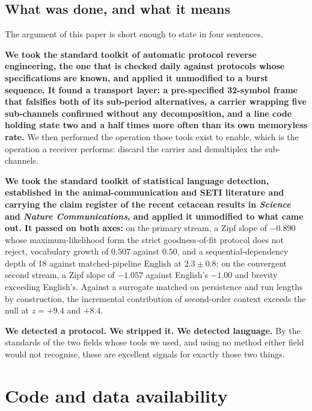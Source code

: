 \documentclass[11pt,a4paper]{article}
\begin{document}
\subsection{What was done, and what it means}

The argument of this paper is short enough to state in four sentences.

\textbf{We took the standard toolkit of automatic protocol reverse engineering, the one
that is checked daily against protocols whose specifications are known, and applied it
unmodified to a burst sequence. It found a transport layer: a pre-specified 32-symbol
frame that falsifies both of its sub-period alternatives, a carrier wrapping five
sub-channels confirmed without any decomposition, and a line code holding state two
and a half times more often than its own memoryless rate.} We then performed the
operation those tools exist to enable, which is the operation a receiver performs:
discard the carrier and demultiplex the sub-channels.

\textbf{We took the standard toolkit of statistical language detection, established in
the animal-communication and SETI literature and carrying the claim register of the
recent cetacean results in \emph{Science} and \emph{Nature Communications}, and applied
it unmodified to what came out. It passed on both axes:} on the primary stream, a Zipf
slope of $-0.890$ whose maximum-likelihood form the strict goodness-of-fit protocol
does not reject, vocabulary growth of $0.507$ against $0.50$, and a
sequential-dependency depth of 18
against matched-pipeline English at $2.3 \pm 0.8$; on the convergent second stream, a
Zipf slope of $-1.057$ against English's $-1.00$ and brevity exceeding English's. Against a surrogate matched on
persistence and run lengths by construction, the incremental contribution of second-order
context exceeds the null at $z = +9.4$ and $+8.4$.

\textbf{We detected a protocol. We stripped it. We detected language.} By the standards
of the two fields whose tools we used, and using no method either field would not
recognise, these are excellent signals for exactly those two things.

\section*{Code and data availability}
\end{document}
